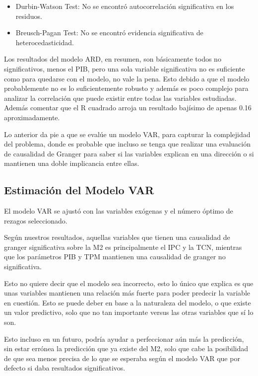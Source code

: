 \documentclass[
  12pt,
]{article}
\providecommand{\tightlist}{%
  \setlength{\itemsep}{0pt}\setlength{\parskip}{0pt}}
\begin{document}
\begin{itemize}
\tightlist
\item
  Durbin-Watson Test: No se encontró autocorrelación significativa en
  los residuos.
\item
  Breusch-Pagan Test: No se encontró evidencia significativa de
  heterocedasticidad.
\end{itemize}

Los resultados del modelo ARD, en resumen, son básicamente todos no
significativos, menos el PIB, pero una sola variable significativa no es
suficiente como para quedarse con el modelo, no vale la pena. Esto
debido a que el modelo probablemente no es lo suficientemente robusto y
además es poco complejo para analizar la correlación que puede existir
entre todas las variables estudiadas. Además comentar que el R cuadrado
arroja un resultado bajísimo de apenas 0.16 aproximadamente.

Lo anterior da pie a que se evalúe un modelo VAR, para capturar la
complejidad del problema, donde es probable que incluso se tenga que
realizar una evaluación de causalidad de Granger para saber si las
variables explican en una dirección o si mantienen una doble implicancia
entre ellas.

\subsection{Estimación del Modelo
VAR}\label{estimaciuxf3n-del-modelo-var}

El modelo VAR se ajustó con las variables exógenas y el número óptimo de
rezagos seleccionado.

Según nuestros resultados, aquellas variables que tienen una causalidad
de granger significativa sobre la M2 es principalmente el IPC y la TCN,
mientras que los parámetros PIB y TPM mantienen una causalidad de
granger no significativa.

Esto no quiere decir que el modelo sea incorrecto, esto lo único que
explica es que unas variables mantienen una relación más fuerte para
poder predecir la variable en cuestión. Esto se puede deber en base a la
naturaleza del modelo, o que existe un valor predictivo, solo que no tan
importante versus las otras variables que sí lo son.

Esto incluso en un futuro, podría ayudar a perfeccionar aún más la
predicción, sin estar errónea la predicción que ya existe del M2, solo
que cabe la posibilidad de que sea menos precisa de lo que se esperaba
según el modelo VAR que por defecto si daba resultados significativos.
\end{document}
